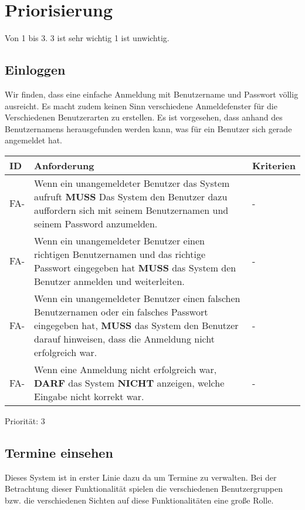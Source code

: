 
\clearpage

\section{Priorisierung}
Von 1 bis 3. 3 ist sehr wichtig 1 ist unwichtig.

\vspace{18pt}

\subsection{Einloggen}
Wir finden, dass eine einfache Anmeldung mit Benutzername und Passwort völlig ausreicht. Es macht zudem keinen Sinn verschiedene Anmeldefenster für die Verschiedenen Benutzerarten zu erstellen. Es ist vorgesehen, dass anhand des Benutzernamens herausgefunden werden kann, was für ein Benutzer sich gerade angemeldet hat.

\vspace{12pt}

\begin{tabular} {|p{}|p{11cm}|p{}|}
	\hline
	ID & Anforderung & Kriterien \\
	\hline
	FA-
	& Wenn ein unangemeldeter Benutzer das System aufruft \textbf{MUSS} Das System den Benutzer dazu auffordern sich mit seinem Benutzernamen und seinem Password anzumelden.
	& - \\
	\hline
	FA- 
	& Wenn ein unangemeldeter Benutzer einen richtigen Benutzernamen und das richtige Passwort eingegeben hat \textbf{MUSS} das System den Benutzer anmelden und weiterleiten.
	& -  \\
	\hline
	FA- 
	& Wenn ein unangemeldeter Benutzer einen falschen Benutzernamen oder ein falsches Passwort eingegeben hat, \textbf{MUSS} das System den Benutzer darauf hinweisen, dass die Anmeldung nicht erfolgreich war.
	& - \\
	\hline
	FA-
	& Wenn eine Anmeldung nicht erfolgreich war, \textbf{DARF} das System \textbf{NICHT} anzeigen, welche Eingabe nicht korrekt war.
	& - \\
	\hline
\end{tabular}
Priorität: 3

\newpage

\subsection{Termine einsehen}
Dieses System ist in erster Linie dazu da um Termine zu verwalten. Bei der Betrachtung dieser Funktionalität spielen die verschiedenen Benutzergruppen bzw. die verschiedenen Sichten auf diese Funktionalitäten eine große Rolle. 

